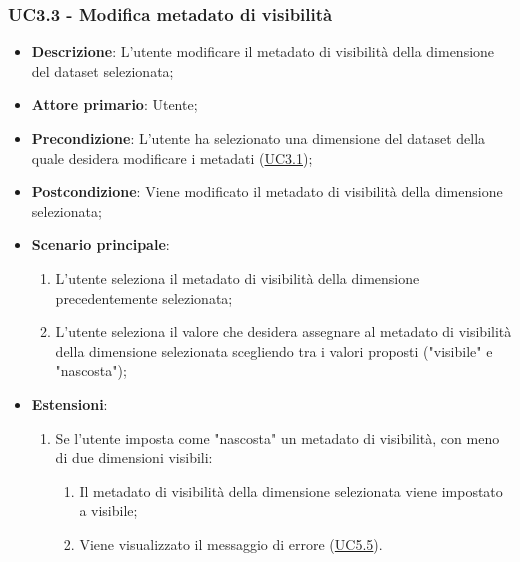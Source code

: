 \subsubsection{UC3.3 - Modifica metadato di visibilità}
\label{ssub:uc3.3}

\begin{itemize}
    \item \textbf{Descrizione}: L’utente modificare il metadato di visibilità della dimensione del dataset selezionata;
	
    \item \textbf{Attore primario}: Utente;
    
    \item \textbf{Precondizione}:   L'utente ha selezionato una dimensione del dataset della quale desidera modificare 
    i metadati (\hyperref[ssub:uc3.1]{UC3.1});

    \item \textbf{Postcondizione}:  Viene modificato il metadato di visibilità della dimensione selezionata;

    \item \textbf{Scenario principale}: 
    \begin{enumerate}
        \item L'utente seleziona il metadato di visibilità della dimensione precedentemente selezionata;
        \item L'utente seleziona il valore che desidera assegnare al metadato di visibilità della dimensione 
        selezionata scegliendo tra i valori proposti ("visibile" e "nascosta");
    \end{enumerate}
    
    \item \textbf{Estensioni}:
    \begin{enumerate}
        \item Se l'utente imposta come "nascosta" un metadato di visibilità, con meno di due dimensioni visibili:
        \begin{enumerate}
            \item Il metadato di visibilità della dimensione selezionata viene impostato a 
            visibile;
            \item Viene visualizzato il messaggio di errore (\hyperref[ssub:uc5.5]{UC5.5}).
        \end{enumerate}
    \end{enumerate}
\end{itemize}